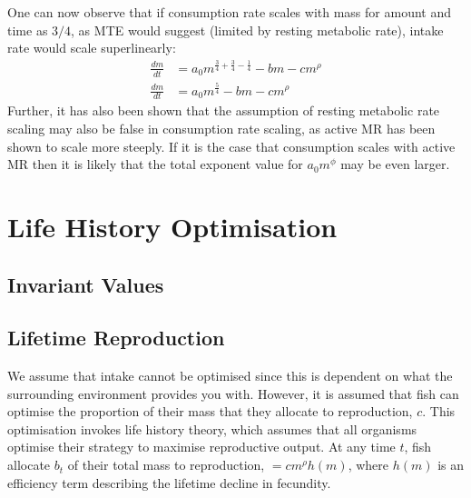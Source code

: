 \documentclass[a4paper]{article} %
\begin{document}
One can now observe that if consumption rate scales with mass for amount and time as $3/4$, as MTE would suggest (limited by resting metabolic rate), intake rate would scale superlinearly:
\begin{align}
    \frac{dm}{dt} &= a_{0}m^{\frac{3}{4} + \frac{3}{4} -\frac{1}{4}} - bm - cm^{\rho} \\
    \frac{dm}{dt} &= a_{0}m^{\frac{5}{4}} - bm - cm^{\rho}
\end{align}
Further, it has also been shown that the assumption of resting metabolic rate scaling may also be false in consumption rate scaling, as active MR has been shown to scale more steeply. If it is the case that consumption scales with active MR then it is likely that the total exponent value for $a_{0}m^\phi$ may be even larger.

\section{Life History Optimisation}
\subsection{Invariant Values}
\subsection{Lifetime Reproduction}
We assume that intake cannot be optimised since this is dependent on what the surrounding environment provides you with. However, it is assumed that fish can optimise the proportion of their mass that they allocate to reproduction, $c$. This optimisation invokes life history theory, which assumes that all organisms optimise their strategy to maximise reproductive output. At any time $t$, fish allocate $b_{t}$ of their total mass to reproduction, $= cm^{\rho}h(m)$, where $h(m)$ is an efficiency term describing the lifetime decline in fecundity. 
\end{document}
